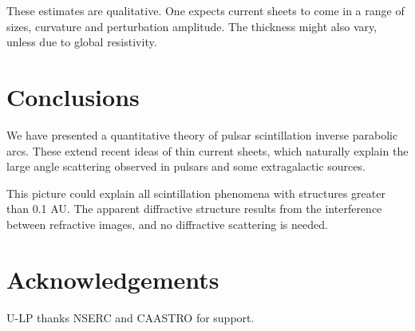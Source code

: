 \documentclass[useAMS,usenatbib]{mn2e}
\begin{document}
These estimates are qualitative.  One expects current sheets to come
in a range of sizes, curvature and perturbation amplitude.  The
thickness might also vary, unless due to global resistivity.


\section{Conclusions}

We have presented a quantitative theory of pulsar scintillation
inverse parabolic arcs.  These extend recent ideas of thin current
sheets, which naturally explain the large angle scattering observed in
pulsars and some extragalactic sources.

This picture could explain all scintillation phenomena with structures
greater than 0.1 AU.  The apparent diffractive structure results from
the interference between refractive images, and no diffractive
scattering is needed.

\section{Acknowledgements}

U-LP thanks NSERC and CAASTRO for support.


\newcommand{\araa}{ARA\&A}   %
\newcommand{\afz}{Afz}       %
\newcommand{\aj}{AJ}         %
\newcommand{\azh}{AZh}       %
\newcommand{\aaa}{A\&A}      %
\newcommand{\aas}{A\&AS}     %
\newcommand{\aar}{A\&AR}     %
\newcommand{\apj}{ApJ}       %
\newcommand{\apjs}{ApJS}     %
\newcommand{\apjl}{ApJ}      %
\newcommand{\apss}{Ap\&SS}   %
\newcommand{\baas}{BAAS}     %
\newcommand{\jaa}{JA\&A}     %
\newcommand{\mnras}{MNRAS}   %
\newcommand{\nat}{Nat}       %
\newcommand{\pasj}{PASJ}     %
\newcommand{\pasp}{PASP}     %
\newcommand{\paspc}{PASPC}   %
\newcommand{\qjras}{QJRAS}   %
\newcommand{\sci}{Sci}       %
\newcommand{\solphys}{Solar Physics}       %
\newcommand{\sova}{SvA}      %
\newcommand{\aap}{A\&A}






\label{lastpage}
\end{document}

